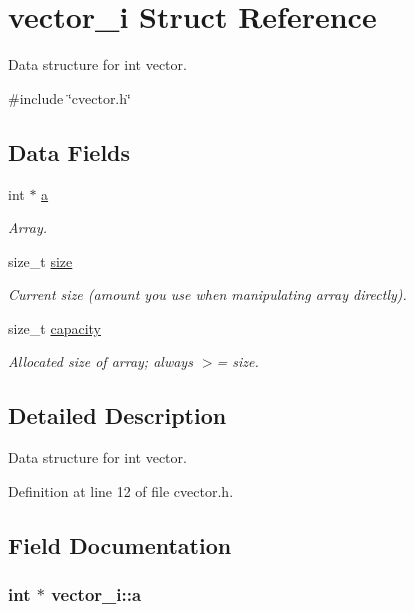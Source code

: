 \hypertarget{structvector__i}{\section{vector\-\_\-i Struct Reference}
\label{structvector__i}
}


Data structure for int vector.  




{\ttfamily \#include \char`\"{}cvector.\-h\char`\"{}}

\subsection*{Data Fields}
\begin{DoxyCompactItemize}
\item 
int $\ast$ \hyperlink{structvector__i_a06e9af564e8e8bc741f57f5f360af392}{a}
\begin{DoxyCompactList}\small\item\em Array. \end{DoxyCompactList}\item 
size\-\_\-t \hyperlink{structvector__i_a8df52068982f4b7dcaa024b37f243282}{size}
\begin{DoxyCompactList}\small\item\em Current size (amount you use when manipulating array directly). \end{DoxyCompactList}\item 
size\-\_\-t \hyperlink{structvector__i_a8e7421832635519ee2ccebd19298b705}{capacity}
\begin{DoxyCompactList}\small\item\em Allocated size of array; always $>$= size. \end{DoxyCompactList}\end{DoxyCompactItemize}


\subsection{Detailed Description}
Data structure for int vector. 



Definition at line 12 of file cvector.\-h.



\subsection{Field Documentation}
\hypertarget{structvector__i_a06e9af564e8e8bc741f57f5f360af392}{
\subsubsection[{a}]{\setlength{\rightskip}{0pt plus 5cm}int $\ast$ vector\-\_\-i\-::a}}\label{structvector__i_a06e9af564e8e8bc741f57f5f360af392}


